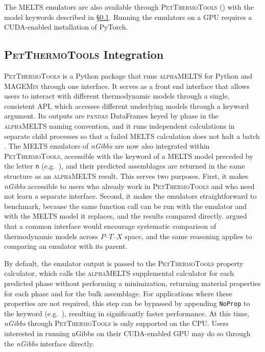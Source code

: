 \noindent The \textsc{MELTS} emulators are also available through \textsc{PetThermoTools} () with
the  model keywords described in \S\ref{ch4-ptt-integration}. Running the emulators on a GPU requires a CUDA-enabled
installation of PyTorch.

\subsection{\textsc{PetThermoTools} Integration}\label{ch4-ptt-integration}

\textsc{PetThermoTools} \citep{gleeson2025} is a Python package that runs \textsc{alphaMELTS} for Python
\citep{antoshechkinaghiorso2018} and \textsc{MAGEMin} \citep{riel2022} through one interface. It serves as a front end interface that 
allows users to interact with different thermodynamic models through a single, consistent API, which accesses different underlying models through a
 keyword argument. Its outputs are \textsc{pandas} DataFrames keyed by phase in the
\textsc{alphaMELTS} naming convention, and it runs independent calculations in separate child processes so that a failed
\textsc{MELTS} calculation does not halt a batch \citep{gleeson2025}. The \textsc{MELTS} emulators of \emph{nGibbs} are now also integrated within
\textsc{PetThermoTools}, accessible with the  keyword of a \textsc{MELTS} model preceded by the letter \texttt{n} (e.g.\ ), and their predicted
assemblages are returned in the same structure as an \textsc{alphaMELTS} result. This serves two purposes. First, it makes
\emph{nGibbs} accessible to users who already work in \textsc{PetThermoTools} and who need not learn a separate interface. Second,
it makes the emulators straightforward to benchmark, because the same function call can be run with the emulator and with the
\textsc{MELTS} model it replaces, and the results compared directly. \citet{gleeson2025} argued that a common interface would
encourage systematic comparison of thermodynamic models across $P$--$T$--$X$ space, and the same reasoning applies to comparing an
emulator with its parent.

By default, the emulator output is passed to the \textsc{PetThermoTools} property calculator, which calls the \textsc{alphaMELTS} 
supplemental calculator for each predicted phase without performing a minimization, returning material properties for each phase and for the bulk assemblage. 
For applications where these properties are not required, this step can be bypassed by appending \texttt{NoProp} to the  keyword (e.g.\ ),
resulting in significantly faster performance. At this time, \emph{nGibbs} through \textsc{PetThermoTools} is only supported on the CPU. Users interested in running nGibbs on their 
CUDA-enabled GPU may do so through the \emph{nGibbs} interface directly.

